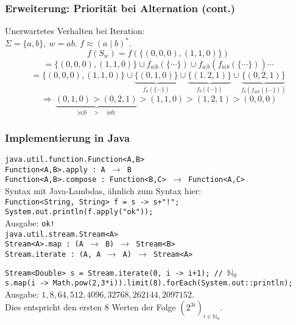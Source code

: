 \documentclass{beamer}
\begin{document}
    \begin{frame}[t]
        \frametitle{Erweiterung: Priorität bei Alternation (cont.)}
        Unerwartetes Verhalten bei Iteration:\\
        $\Sigma = \{a,b\},\ w = ab$. $f \approx (a\mid b)^*$.
        \pause
        $$
            f(S_w) = f(\{(0,0,0),(1,1,0)\})
        $$$$
            = \{(0,0,0),(1,1,0)\} \cup f_{a|b}(\{\cdots\}) \cup f_{a|b}(f_{a|b}(\{\cdots\})) \cdots
        $$$$
            = \{(0,0,0),(1,1,0)\}
            \cup \underbrace{\{(0,1,0)\}}_{f_a(\{\cdots\})}
            \cup \underbrace{\{(1,2,1)\}}_{f_b(\{\cdots\})}
            \cup \underbrace{\{(0,2,1)\}}_{f_b(f_{a|b}(\{\cdots\}))}
        $$
        \pause
        $$
            \,\Longrightarrow\, \underbrace{(0,1,0) > (0,2,1)}_{|a|b\quad >\quad |ab|} > (1,1,0) > (1,2,1) > (0,0,0)
        $$
    \end{frame}

    \begin{frame}[t]
        \frametitle{Implementierung in Java}
        {\scriptsize
            \texttt{java.util.function.Function<A,B>}\\
            \texttt{Function<A,B>.apply :\ A $\to$ B}\\
            \texttt{Function<A,B>.compose :\ Function<B,C> $\to$ Function<A,C>}\\[10pt]
            \pause
            Syntax mit Java-Lambdas, ähnlich zum Syntax hier:\\[5pt]
            \texttt{Function<String, String> f = s -> s+"!";}\\
            \texttt{System.out.println(f.apply("ok"));}\\[5pt]
            Ausgabe: \texttt{ok!}\\[10pt]
            \pause
            \texttt{java.util.stream.Stream<A>}\\
            \texttt{Stream<A>.map :\ (A $\to$ B) $\to$ Stream<B>}\\\pause
            \texttt{Stream.iterate :\ (A, A $\to$ A) $\to$ Stream<A>}\\[10pt]\pause

            \texttt{Stream<Double> s = Stream.iterate(0, i -> i+1); // $\mathbb{N}_0$}\\
            \texttt{s.map(i -> Math.pow(2,3*i)).limit(8).forEach(System.out::println);}\\[5pt]
            Ausgabe: $1, 8, 64, 512, 4096, 32768, 262144, 2097152$.\\
            Dies entspricht den ersten 8 Werten der Folge $(2^{3i})_{i \in \mathbb{N}_0}$.
        }
    \end{frame}
\end{document}
